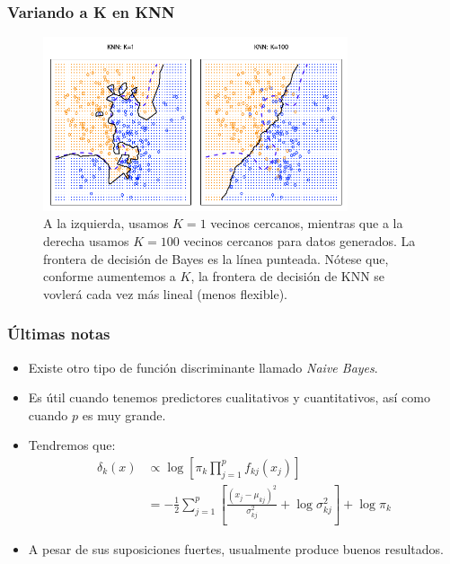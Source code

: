 \documentclass[usenames,dvipsnames]{beamer} %
\newcommand\defi[1]{\textcolor{NavyBlue}{\textit{#1}}}
\begin{document}
\begin{frame}\frametitle{Variando a K en KNN}
\begin{figure}
	\centering
	\includegraphics[width=0.8\textwidth]{images/islr/fig_2_16.png}
	\caption{A la izquierda, usamos $K=1$ vecinos cercanos, mientras que a la derecha usamos $K=100$ vecinos cercanos para datos generados. La frontera de decisi\'on de Bayes es la l\'inea punteada. N\'otese que, conforme aumentemos a $K$, la frontera de decisi\'on de KNN se vovler\'a cada vez m\'as lineal (menos flexible).}
	\label{fig:islr_2-16}
\end{figure}
\end{frame}

\begin{frame}\frametitle{\'Ultimas notas}
\begin{itemize}
	\item Existe otro tipo de funci\'on discriminante llamado \defi{Naive Bayes}.
	\item Es \'util cuando tenemos predictores cualitativos y cuantitativos, as\'i como cuando $p$ es muy grande.
	\item Tendremos que:
	\begin{equation*}
	\begin{aligned} \delta_k(x) &\propto \log{\left[ \pi_k \prod_{j=1}^{p}f_{kj}(x_j) \right]}\\
	&=-\frac{1}{2}\sum_{j=1}^{p}\left[\frac{(x_j-\mu_{kj})^2}{\sigma_{kj}^2} +\log{\sigma_{kj}^2}\right]+\log{\pi_k} 
	\end{aligned}
	\end{equation*}
	\item A pesar de sus suposiciones fuertes, usualmente produce buenos resultados.
\end{itemize}
\end{frame}
\end{document}
